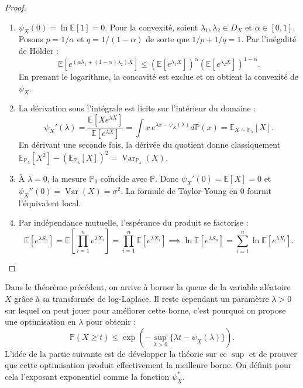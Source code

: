 \begin{proof}
    \begin{enumerate}
        \item $\psi_X(0) = \ln \mathbb{E}[1] = 0$. Pour la convexité, soient $\lambda_1, \lambda_2 \in D_X$ et $\alpha \in [0, 1]$. Posons $p = 1/\alpha$ et $q = 1/(1-\alpha)$ de sorte que $1/p + 1/q = 1$. Par l'inégalité de Hölder :
        \begin{equation*}
            \mathbb{E}\left[ e^{(\alpha \lambda_1 + (1-\alpha)\lambda_2)X} \right] \leqslant \left( \mathbb{E}\left[ e^{\lambda_1 X} \right] \right)^\alpha \left( \mathbb{E}\left[ e^{\lambda_2 X} \right] \right)^{1-\alpha}.
        \end{equation*}
        En prenant le logarithme, la concavité est exclue et on obtient la convexité de $\psi_X$.
        \item La dérivation sous l'intégrale est licite sur l'intérieur du domaine :
        \begin{equation*}
            \psi_X'(\lambda) = \frac{\mathbb{E}[X e^{\lambda X}]}{\mathbb{E}[e^{\lambda X}]} = \int x \, e^{\lambda x - \psi_X(\lambda)} d\mathbb{P}(x) = \mathbb{E}_{X \sim \mathbb{P}_\lambda}[X].
        \end{equation*}
        En dérivant une seconde fois, la dérivée du quotient donne classiquement $\mathbb{E}_{\mathbb{P}_\lambda}[X^2] - (\mathbb{E}_{\mathbb{P}_\lambda}[X])^2 = \operatorname{Var}_{\mathbb{P}_\lambda}(X)$.
        \item À $\lambda = 0$, la mesure $\mathbb{P}_0$ coïncide avec $\mathbb{P}$. Donc $\psi_X'(0) = \mathbb{E}[X] = 0$ et $\psi_X''(0) = \operatorname{Var}(X) = \sigma^2$. La formule de Taylor-Young en 0 fournit l'équivalent local.
        \item Par indépendance mutuelle, l'espérance du produit se factorise :
        \begin{equation*}
            \mathbb{E}\left[ e^{\lambda S_n} \right] = \mathbb{E}\left[ \prod_{i=1}^n e^{\lambda X_i} \right] = \prod_{i=1}^n \mathbb{E}\left[ e^{\lambda X_i} \right] \implies \ln \mathbb{E}\left[ e^{\lambda S_n} \right] = \sum_{i=1}^n \ln \mathbb{E}\left[ e^{\lambda X_i} \right].
        \end{equation*}
    \end{enumerate}
\end{proof}

\begin{remark}
    Dans le théorème précédent, on arrive à borner la queue de la variable aléatoire $X$ grâce à sa transformée de log-Laplace. Il reste cependant un paramètre $ \lambda > 0$ sur lequel on peut jouer pour améliorer cette borne, c'est pourquoi on propose une optimisation en $ \lambda$ pour obtenir : 
    \begin{equation}
        \mathbb{P}(X \geqslant t) \leqslant \exp\left( - \sup_{\lambda > 0} \{ \lambda t - \psi_X(\lambda) \} \right).
    \end{equation}
    L'idée de la partie suivante est de développer la théorie sur ce $\sup$ et de prouver que cette optimisation produit effectivement la meilleure borne. On définit pour cela l'exposant exponentiel comme la fonction $ \psi^*_X$. 
\end{remark}

